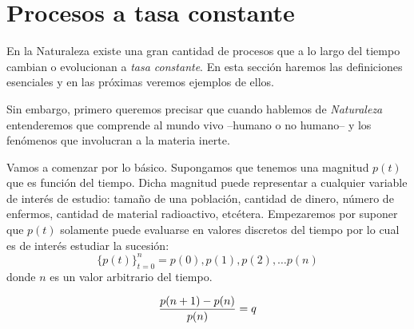 \section{Procesos a tasa constante}

En la Naturaleza existe una gran cantidad de procesos que a lo largo del tiempo cambian o evolucionan a {\it tasa constante}. En esta sección haremos las definiciones esenciales y en las próximas veremos ejemplos de ellos.

Sin embargo, primero queremos precisar que cuando hablemos de {\it Naturaleza } entenderemos que comprende al mundo vivo --humano o no humano-- y los fenómenos que involucran a la materia inerte.

Vamos a  comenzar por lo básico. Supongamos que tenemos una magnitud $p(t)$ que es función del tiempo. Dicha magnitud puede representar a cualquier variable de interés de estudio: tamaño de una población, cantidad de dinero, número de enfermos, cantidad de material radioactivo, etcétera. Empezaremos por suponer que $p(t)$ solamente puede evaluarse en valores discretos del tiempo por lo cual es de interés estudiar la sucesión:
\[
\{p(t)\}_{t=0}^n = p(0),p(1),p(2),\hdots p(n)
\]
\noindent donde $n$ es un valor arbitrario del tiempo.


\[
 \dfrac {p(n+1) -p(n) }{p(n)}=q\\
 \]

